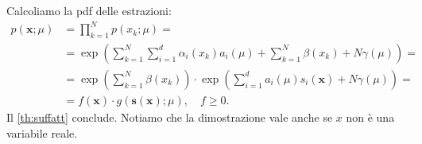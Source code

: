 \begin{solution}
	Calcoliamo la pdf delle estrazioni:
	\begin{align*}
		p(\mathbf x;\mu)
		&= \prod_{k=1}^N p(x_k;\mu) = \\
		&= \exp \left( \sum_{k=1}^N \sum_{i=1}^d \alpha_i(x_k)a_i(\mu)
		+ \sum_{k=1}^N \beta(x_k) + N\gamma(\mu) \right) = \\
		&= \exp \left( \sum_{k=1}^N \beta(x_k) \right)
		\cdot \exp \left( \sum_{i=1}^d a_i(\mu)s_i(\mathbf x) + N\gamma(\mu) \right) = \\
		&= f(\mathbf x) \cdot g(\mathbf s(\mathbf x);\mu), \quad f\ge0.
	\end{align*}
	Il \autoref{th:suffatt} conclude.
	Notiamo che la dimostrazione vale anche se $x$ non è una variabile reale.
\end{solution}
